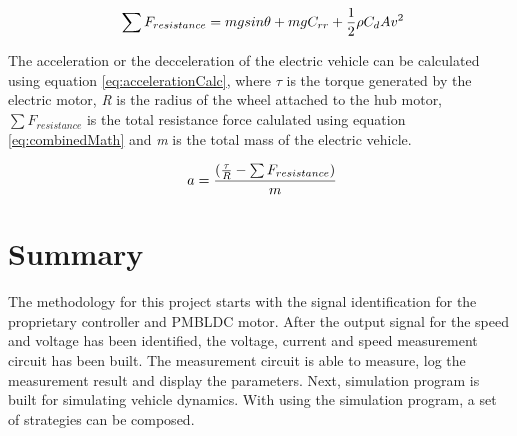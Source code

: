 \begin{equation}
	\label{eq:combinedMath}
	\text{\myequations{Combined mathematical model for vehicle dynamics}}
	\sum F_{resistance} = mgsin\theta + mg C_{rr} + \frac{1}{2}\rho C_{d} A v^2 
\end{equation}

The acceleration or the decceleration of the electric vehicle can be calculated using equation \ref{eq:accelerationCalc}, where \textit{$\tau $} is the torque generated by the electric motor, \textit{R} is the radius of the wheel attached to the hub motor, \textit{$\sum F_{resistance}$} is the total resistance force calulated using equation \ref{eq:combinedMath} and \textit{m} is the total mass of the electric vehicle.

\begin{equation}
	\label{eq:accelerationCalc}
	\text{\myequations{Acceleration/Decceleration of the electric vehicle}}
	a = \frac{(\frac{\tau}{R} - \sum F_{resistance})}{m}
\end{equation}

\section{Summary}

The methodology for this project starts with the signal identification for the proprietary controller and PMBLDC motor. After the output signal for the speed and voltage has been identified, the voltage, current and speed measurement circuit has been built. The measurement circuit is able to measure, log the measurement result and display the parameters. Next, simulation program is built for simulating vehicle dynamics. With using the simulation program, a set of strategies can be composed.
